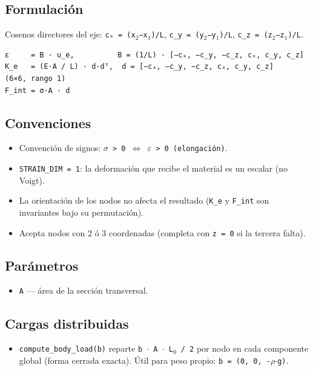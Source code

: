\documentclass[11pt,letterpaper,oneside]{report}
\begin{document}
\subsection{Formulación}
Cosenos directores del eje: \texttt{cₓ = (x\ensuremath{_{2}}−x\ensuremath{_{1}})/L}, \texttt{c\_y = (y\ensuremath{_{2}}−y\ensuremath{_{1}})/L}, \texttt{c\_z = (z\ensuremath{_{2}}−z\ensuremath{_{1}})/L}.

\begin{lstlisting}
ε     = B · u_e,          B = (1/L) · [−cₓ, −c_y, −c_z, cₓ, c_y, c_z]
K_e   = (E·A / L) · d·dᵀ,  d = [−cₓ, −c_y, −c_z, cₓ, c_y, c_z]    (6×6, rango 1)
F_int = σ·A · d

\end{lstlisting}

\subsection{Convenciones}
\begin{itemize}
  \item Convención de signos: \texttt{\ensuremath{\sigma} > 0 \ensuremath{\Leftrightarrow} \ensuremath{\varepsilon} > 0 (elongación)}.
  \item \texttt{STRAIN\_DIM = 1}: la deformación que recibe el material es un escalar (no Voigt).
  \item La orientación de los nodos no afecta el resultado (\texttt{K\_e} y \texttt{F\_int} son invariantes bajo su permutación).
  \item Acepta nodos con 2 ó 3 coordenadas (completa con \texttt{z = 0} si la tercera falta).
\end{itemize}

\subsection{Parámetros}
\begin{itemize}
  \item \texttt{A} --- área de la sección transversal.
\end{itemize}

\subsection{Cargas distribuidas}
\begin{itemize}
  \item \texttt{compute\_body\_load(b)} reparte \texttt{b \ensuremath{\cdot} A \ensuremath{\cdot} L\ensuremath{_{0}} / 2} por nodo en cada componente global (forma cerrada exacta). Útil para peso propio: \texttt{b = (0, 0, -\ensuremath{\rho}\ensuremath{\cdot}g)}.
\end{itemize}
\end{document}
